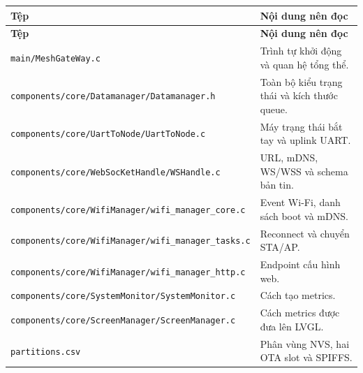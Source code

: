 \documentclass[a4paper]{article}
\newcommand{\pathcode}[1]{\nolinkurl{#1}}
\begin{document}
\begin{longtable}{p{6.1cm}p{7.9cm}}
\toprule
\textbf{Tệp} & \textbf{Nội dung nên đọc}\\
\midrule
\endfirsthead
\toprule
\textbf{Tệp} & \textbf{Nội dung nên đọc}\\
\midrule
\endhead
\pathcode{main/MeshGateWay.c} & Trình tự khởi động và quan hệ tổng thể.\\
\pathcode{components/core/Datamanager/Datamanager.h} & Toàn bộ kiểu trạng thái và kích thước queue.\\
\pathcode{components/core/UartToNode/UartToNode.c} & Máy trạng thái bắt tay và uplink UART.\\
\pathcode{components/core/WebSocKetHandle/WSHandle.c} & URL, mDNS, WS/WSS và schema bản tin.\\
\pathcode{components/core/WifiManager/wifi_manager_core.c} & Event Wi-Fi, danh sách boot và mDNS.\\
\pathcode{components/core/WifiManager/wifi_manager_tasks.c} & Reconnect và chuyển STA/AP.\\
\pathcode{components/core/WifiManager/wifi_manager_http.c} & Endpoint cấu hình web.\\
\pathcode{components/core/SystemMonitor/SystemMonitor.c} & Cách tạo metrics.\\
\pathcode{components/core/ScreenManager/ScreenManager.c} & Cách metrics được đưa lên LVGL.\\
\pathcode{partitions.csv} & Phân vùng NVS, hai OTA slot và SPIFFS.\\
\bottomrule
\end{longtable}
\end{document}
